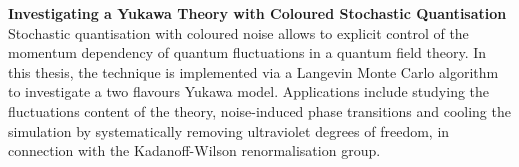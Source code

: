 \documentclass[
11pt, %
english, %
singlespacing, %
headsepline, %
]{MastersDoctoralThesis} %
\author{John \textsc{Smith}} %
\begin{document}
\frontmatter %

\pagestyle{plain} %


\pagestyle{plain} %
\vspace{50pt}
\noindent\textbf{\large Investigating a Yukawa Theory with Coloured Stochastic Quantisation}
\vspace{20pt}\\
Stochastic quantisation with coloured noise allows to explicit control of the momentum dependency of 
quantum fluctuations in a quantum field theory.
In this thesis, the technique is implemented via a Langevin Monte Carlo algorithm to investigate a two flavours Yukawa model.
Applications include studying the fluctuations content of the theory, noise-induced 
phase transitions and 
cooling the simulation by systematically removing ultraviolet degrees of freedom, in connection with the Kadanoff-Wilson renormalisation group.

\cleardoublepage

{
    \hypersetup{linkcolor=black}
    \tableofcontents
}







\mainmatter %

\pagestyle{thesis} %

\end{document}
